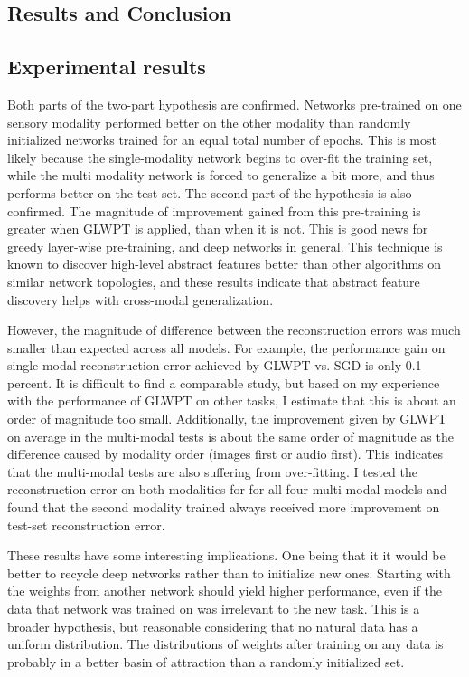 \documentclass[12pt]{article}
\begin{document}
\begin{doublespacing}
\section{Results and Conclusion}
	\subsection{Experimental results}
	Both parts of the two-part hypothesis are confirmed. Networks pre-trained on one sensory modality performed better on the other modality than randomly initialized networks trained for an equal total number of epochs. This is most likely because the single-modality network begins to over-fit the training set, while the multi modality network is forced to generalize a bit more, and thus performs better on the test set. The second part of the hypothesis is also confirmed. The magnitude of improvement gained from this pre-training is greater when GLWPT is applied, than when it is not. This is good news for greedy layer-wise pre-training, and deep networks in general. This technique is known to discover high-level abstract features better than other algorithms on similar network topologies, and these results indicate that abstract feature discovery helps with cross-modal generalization. 
		
	However, the magnitude of difference between the reconstruction errors was much smaller than expected across all models. For example, the performance gain on single-modal reconstruction error achieved by GLWPT vs. SGD is only 0.1 percent. It is difficult to find a comparable study, but based on my experience with the performance of GLWPT on other tasks, I estimate that this is about an order of magnitude too small. Additionally, the improvement given by GLWPT on average in the multi-modal tests is about the same order of magnitude as the difference caused by modality order (images first or audio first). This indicates that the multi-modal tests are also suffering from over-fitting. I tested the reconstruction error on both modalities for for all four multi-modal models and found that the second modality trained always received more improvement on test-set reconstruction error. 
		
	These results have some interesting implications. One being that it it would be better to recycle deep networks rather than to initialize new ones. Starting with the weights from another network should yield higher performance, even if the data that network was trained on was irrelevant to the new task. This is a broader hypothesis, but reasonable considering that no natural data has a uniform distribution. The distributions of weights after training on any data is probably in a better basin of attraction than a randomly initialized set.
	

\end{doublespacing}
\end{document}
